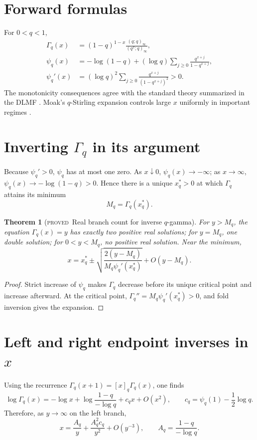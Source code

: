 \documentclass[11pt,letterpaper,oneside,openany]{book}
\newtheorem{theorem}{Theorem}[chapter]
\theoremstyle{definition}
\theoremstyle{remark}
\newcommand{\statusproved}{\textcolor{provedgreen}{\textsc{proved}}}
\begin{document}
\section{Forward formulas}
For \(0<q<1\),
\begin{align}
 \Gamma_q(x)&=(1-q)^{1-x}\frac{(q;q)_\infty}{(q^x;q)_\infty},
 \label{eq:qgamma-definition}\\
 \psi_q(x)&=-\log(1-q)+(\log q)
 \sum_{j\ge0}\frac{q^{x+j}}{1-q^{x+j}},
 \label{eq:qdigamma-definition}\\
 \psi_q'(x)&=(\log q)^2
 \sum_{j\ge0}\frac{q^{x+j}}{(1-q^{x+j})^2}>0.
 \label{eq:qtrigamma-positive}
\end{align}
The monotonicity consequences agree with the standard theory summarized in the
DLMF \cite{DLMF}.  Moak's \(q\)-Stirling expansion controls large \(x\)
uniformly in important regimes \cite{Moak1984}.

\section{Inverting \texorpdfstring{\(\Gamma_q\)}{Gammaq} in its argument}
Because \(\psi_q' >0\), \(\psi_q\) has at most one zero.  As
\(x\downarrow0\), \(\psi_q(x)\to-\infty\); as \(x\to\infty\),
\(\psi_q(x)\to-\log(1-q)>0\).  Hence there is a unique
\(x_q^*>0\) at which \(\Gamma_q\) attains its minimum
\[
 M_q=\Gamma_q(x_q^*).
\]

\begin{theorem}[\statusproved\ Real branch count for inverse \(q\)-gamma]
For \(y>M_q\), the equation \(\Gamma_q(x)=y\) has exactly two positive real
solutions; for \(y=M_q\), one double solution; for \(0<y<M_q\), no positive
real solution.  Near the minimum,
\begin{equation}\label{eq:qgamma-minimum-inverse}
 x=x_q^*\pm
 \sqrt{\frac{2(y-M_q)}{M_q\psi_q'(x_q^*)}}+O(y-M_q).
\end{equation}
\end{theorem}
\begin{proof}
Strict increase of \(\psi_q\) makes \(\Gamma_q\) decrease before its unique
critical point and increase afterward.  At the critical point,
\(\Gamma_q''=M_q\psi_q'(x_q^*)>0\), and fold inversion gives the expansion.
\end{proof}

\section{Left and right endpoint inverses in \texorpdfstring{\(x\)}{x}}
Using the recurrence \(\Gamma_q(x+1)=[x]_q\Gamma_q(x)\), one finds
\begin{equation}\label{eq:qgamma-left-forward}
 \log\Gamma_q(x)
 =-\log x+\log\frac{1-q}{-\log q}
 +c_qx+O(x^2),
 \qquad
 c_q=\psi_q(1)-\frac12\log q.
\end{equation}
Therefore, as \(y\to\infty\) on the left branch,
\begin{equation}\label{eq:qgamma-left-inverse}
 x=\frac{A_q}{y}+\frac{A_q^2c_q}{y^2}+O(y^{-3}),
 \qquad A_q=\frac{1-q}{-\log q}.
\end{equation}
\end{document}
